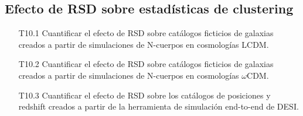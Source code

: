 \subsection*{Efecto de RSD sobre estad\'isticas de clustering}
\begin{itemize}
\item[T10.1] 
Cuantificar el efecto de RSD sobre cat\'alogos ficticios de
  galaxias creados a partir de simulaciones de N-cuerpos en
  cosmolog\'ias LCDM.
\item[T10.2] Cuantificar el efecto de RSD sobre cat\'alogos ficticios de
  galaxias creados a partir de simulaciones de N-cuerpos en
  cosmolog\'ias $\omega$CDM.
\item[T10.3] Cuantificar el efecto de RSD sobre los cat\'alogos de
  posiciones y redshift creados a partir de la herramienta de
  simulaci\'on end-to-end de DESI.
\end{itemize}


